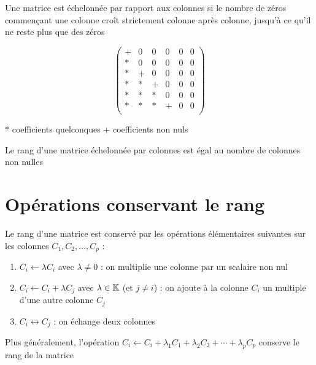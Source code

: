 \begin{frame}
\begin{mydefinition}
Une matrice est échelonnée par rapport aux colonnes si
le nombre de zéros commençant une colonne croît strictement colonne après colonne,
jusqu'à ce qu'il ne reste plus que des zéros
\end{mydefinition}

$$
\begin{pmatrix}
+ & 0 & 0 & 0 & 0 & 0 \\
* & 0 & 0 & 0 & 0 & 0 \\
* & + & 0 & 0 & 0 & 0 \\
* & * & + & 0 & 0 & 0 \\
* & * & * & 0 & 0 & 0 \\
* & * & * & + & 0 & 0 \\
\end{pmatrix}
$$ 

\centerline{$*$ coefficients quelconques \qquad $+$ coefficients non nuls}

\begin{proposition}\label{prop:rangmatech}
\vspace*{-1.5ex}
Le rang d'une matrice échelonnée par colonnes est égal au nombre
de colonnes non nulles
\end{proposition} 

\end{frame}

\section{Opérations conservant le rang}

\begin{frame}
\begin{proposition}
\label{prop:opcolonnes}
Le rang d'une matrice est conservé par les opérations élémentaires suivantes sur les 
colonnes $C_1, C_2, \ldots, C_p$ :
\pause
\begin{enumerate}
  \item $C_i \leftarrow \lambda C_i$ avec $\lambda \neq 0$ : 
  on multiplie une colonne par un scalaire non nul
\pause    
  \item $C_i \leftarrow C_i+\lambda C_j$ avec $\lambda \in \mathbb{K}$ (et $j\neq i$) :
  on ajoute à la colonne $C_i$ un multiple d'une autre colonne $C_j$
\pause  
  \item $C_i \leftrightarrow C_j$ : on échange deux colonnes
\end{enumerate}
\end{proposition}

\pause
Plus généralement, l'opération 
$C_i \leftarrow C_i + \lambda_1 C_1 + \lambda_2 C_2 + \cdots + \lambda_p C_p$ 
conserve le rang de la matrice




\end{frame}

